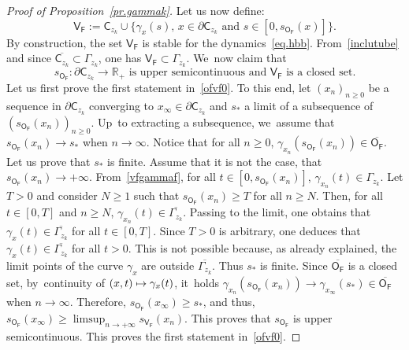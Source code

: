 \documentclass[JEP,XML,SOM,Unicode,NoEqCountersInSection,NoFloatCountersInSection,published]{cedram}
\newcommand\mto{\mathchoice{\longmapsto}{\mapsto}{\mapsto}{\mapsto}}
\let\pa\partial
\theoremstyle{plain}
\theoremstyle{definition}
\begin{document}
\begin{proof}[Proof of Proposition~\ref{pr.gammak}]
Let us now define:
\begin{equation}\label{VF}
\mathsf V_{\mathsf F}:= \mathsf C_{z_k} \cup \big \{ \gamma_x(s), \, x\in \pa \mathsf C_{z_k} \text{ and } s\in [0,s_{\mathsf O_{\mathsf F}}(x)]\big \}.
\end{equation}
By construction, the set $\mathsf V_{\mathsf F}$
is stable for the dynamics~\eqref{eq.hbb}. From~\eqref{inclutube} and since $\overline{\mathsf C_{z_k}}\subset \Gamma_{z_k}$, one has $\mathsf V_{\mathsf F}\subset \Gamma_{z_k}$. We~now claim that
\begin{equation}\label{ofvf0}
s_{\mathsf O_{\mathsf F}}: \pa \mathsf C_{z_k}\to \mathbb R_+ \text{ is upper semicontinuous and }
{ \mathsf V_{\mathsf F}}\text{ is a closed set}.
\end{equation}
Let us first prove the first statement in~\eqref{ofvf0}.
To this end, let $(x_n)_{n\ge 0}$ be a sequence in $ \pa { \mathsf C_{z_k}}$ converging to $x_{\infty}\in \pa { \mathsf C_{z_k}}$ and $s_*$ a limit of a subsequence of $(s_{\mathsf O_{\mathsf F}}(x_n))_{n\ge 0}$.
Up~to extracting a subsequence, we~assume that $s_{\mathsf O_{\mathsf F}}(x_n)\to s_*$ when $n\to \infty$.
Notice that for all $n\ge 0$,
$\gamma_{x_n}(s_{\mathsf O_{\mathsf F}}(x_n))\in \overline{\mathsf O_{\mathsf F}}$.
Let us prove that $s_*$ is finite. Assume that it is not the case, \ie that $s_{\mathsf O_{\mathsf F}}(x_n)\to +\infty$. From~\eqref{vfgammaf}, for all $t\in [0,s_{\mathsf O_{\mathsf F}}(x_n)]$, $\gamma_{x_n}(t)\in \Gamma_{z_k}$. Let $T>0$ and consider $N\ge 1$ such that $s_{\mathsf O_{\mathsf F}}(x_n)\ge T$ for all $n\ge N$. Then, for all $t\in [0,T]$ and $n\ge N$, $\gamma_{x_n}(t)\in \overline{\Gamma_{z_k}}$. Passing to the limit, one obtains that
$\gamma_{x}(t)\in \overline{\Gamma_{z_k}}$ for all $t\in [0,T]$. Since $T>0$ is arbitrary, one deduces that $\gamma_{x}(t)\in \overline{\Gamma_{z_k}}$ for all $t>0$. This is not possible because, as already explained, the limit points of the curve $\gamma_{x}$ are outside $ \overline{\Gamma_{z_k}}$. Thus $s_*$ is finite.
Since
$\overline{\mathsf O_{\mathsf F}}$ is a closed set, by~continuity of $(x,t)\mto \gamma_x(t)$, it~holds $\gamma_{x_n}(s_{\mathsf O_{\mathsf F}}(x_n))\to \gamma_{x_{\infty}}(s_*)\in \overline{\mathsf O_{\mathsf F}}$ when $n\to \infty$. Therefore, $s_{\mathsf O_{\mathsf F}}(x_{\infty})\ge s_*$, and thus, $s_{\mathsf O_{\mathsf F}}(x_{\infty})\ge \limsup_{n\to +\infty }s_{\mathsf V_{\mathsf F}}(x_n)$.
This proves that $s_{\mathsf O_{\mathsf F}}$ is upper
semicontinuous. This proves the first statement in~\eqref{ofvf0}.


\end{proof}
\end{document}
